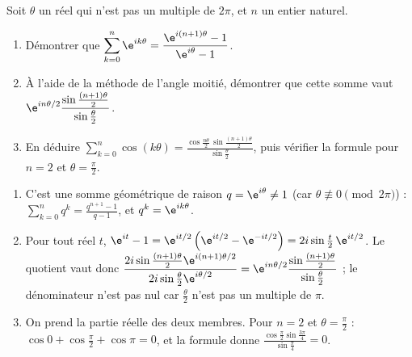 \begin{exercise}
Soit $\theta$ un réel qui n'est pas un multiple de $2\pi$, et $n$ un entier naturel.
\begin{enumerate}
\item Démontrer que $\displaystyle\sum_{k=0}^{n}\e^{ik\theta}=\frac{\e^{i(n+1)\theta}-1}{\e^{i\theta}-1}$.
\item À l'aide de la méthode de l'angle moitié, démontrer que cette somme vaut $\e^{in\theta/2}\dfrac{\sin\frac{(n+1)\theta}2}{\sin\frac\theta2}$.
\item En déduire $\displaystyle\sum_{k=0}^{n}\cos(k\theta)=\frac{\cos\frac{n\theta}2\,\sin\frac{(n+1)\theta}2}{\sin\frac\theta2}$, puis vérifier la formule pour $n=2$ et $\theta=\frac\pi2$.
\end{enumerate}
\end{exercise}
\begin{solution}
\begin{enumerate}
\item C'est une somme géométrique de raison $q=\e^{i\theta}\neq1$ (car $\theta\not\equiv0\pmod{2\pi}$) : $\sum_{k=0}^nq^k=\frac{q^{n+1}-1}{q-1}$, et $q^k=\e^{ik\theta}$.
\item Pour tout réel $t$, $\e^{it}-1=\e^{it/2}\left(\e^{it/2}-\e^{-it/2}\right)=2i\sin\frac t2\,\e^{it/2}$. Le quotient vaut donc $\dfrac{2i\sin\frac{(n+1)\theta}2\e^{i(n+1)\theta/2}}{2i\sin\frac\theta2\e^{i\theta/2}}=\e^{in\theta/2}\dfrac{\sin\frac{(n+1)\theta}2}{\sin\frac\theta2}$ ; le dénominateur n'est pas nul car $\frac\theta2$ n'est pas un multiple de $\pi$.
\item On prend la partie réelle des deux membres. Pour $n=2$ et $\theta=\frac\pi2$ : $\cos0+\cos\frac\pi2+\cos\pi=0$, et la formule donne $\frac{\cos\frac\pi2\sin\frac{3\pi}4}{\sin\frac\pi4}=0$.
\end{enumerate}
\end{solution}

\mxnewpage

